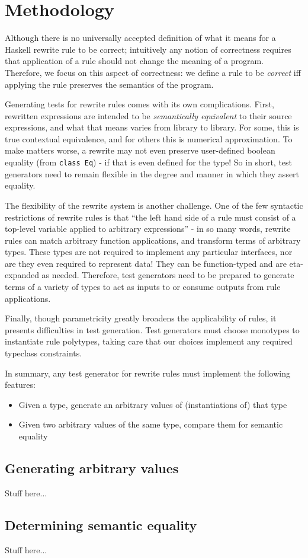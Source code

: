 \section{Methodology}
\label{sec:methodology}

Although there is no universally accepted definition of what it means for a
Haskell rewrite rule to be correct; intuitively any notion of correctness
requires that application of a rule should not change the meaning of a program.
Therefore, we focus on this aspect of correctness: we define a rule to be
\textit{correct} iff applying the rule preserves the semantics of the program.

Generating tests for rewrite rules comes with its own complications. First, rewritten expressions are intended to be \textit{semantically equivalent} to their source expressions, and what that means varies from library to library. For some, this is true contextual equivalence, and for others this is numerical approximation. To make matters worse, a rewrite may not even preserve user-defined boolean equality (from \texttt{class Eq}) - if that is even defined for the type! So in short, test generators need to remain flexible in the degree and manner in which they assert equality.

The flexibility of the rewrite system is another challenge. One of the few syntactic restrictions of rewrite rules is that ``the left hand side of a rule must consist of a top-level variable applied to arbitrary expressions'' \cite{userguide} - in so many words, rewrite rules can match arbitrary function applications, and transform terms of arbitrary types. These types are not required to implement any particular interfaces, nor are they even required to represent data! They can be function-typed and are eta-expanded as needed. Therefore, test generators need to be prepared to generate terms of a variety of types to act as inputs to or consume outputs from rule applications.

Finally, though parametricity greatly broadens the applicability of rules, it presents difficulties in test generation. Test generators must choose monotypes to instantiate rule polytypes, taking care that our choices implement any required typeclass constraints.

In summary, any test generator for rewrite rules must implement the following features:

\begin{itemize}
  \item Given a type, generate an arbitrary values of (instantiations of) that type
  \item Given two arbitrary values of the same type, compare them for semantic equality
\end{itemize}

\subsection{Generating arbitrary values}

Stuff here...

\subsection{Determining semantic equality}

Stuff here...
